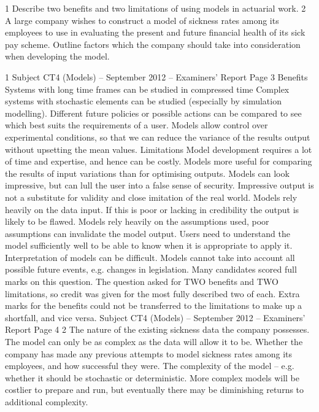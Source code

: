 \documentclass[a4paper,12pt]{article}
\begin{document}
\begin{enumerate}
1 Describe two benefits and two limitations of using models in actuarial work. 
2 A large company wishes to construct a model of sickness rates among its employees to use in evaluating the present and future financial health of its sick pay scheme.
Outline factors which the company should take into consideration when developing the model. 

1
Subject CT4 (Models) – September 2012 – Examiners’ Report
Page 3
Benefits
Systems with long time frames can be studied in compressed time
Complex systems with stochastic elements can be studied (especially by simulation
modelling).
Different future policies or possible actions can be compared to see which best suits the
requirements of a user.
Models allow control over experimental conditions, so that we can reduce the variance of the results output without upsetting the mean values.
Limitations
Model development requires a lot of time and expertise, and hence can be costly.
Models more useful for comparing the results of input variations than for optimising outputs.
Models can look impressive, but can lull the user into a false sense of security. Impressive output is not a substitute for validity and close imitation of the real world.
Models rely heavily on the data input. If this is poor or lacking in credibility the output is likely to be flawed.
Models rely heavily on the assumptions used, poor assumptions can invalidate the model
output.
Users need to understand the model sufficiently well to be able to know when it is
appropriate to apply it.
Interpretation of models can be difficult.
Models cannot take into account all possible future events, e.g. changes in legislation.
Many candidates scored full marks on this question. The question asked for TWO benefits
and TWO limitations, so credit was given for the most fully described two of each. Extra marks for the benefits could not be transferred to the limitations to make up a shortfall, and
vice versa.
Subject CT4 (Models) – September 2012 – Examiners’ Report
Page 4
2
The nature of the existing sickness data the company possesses. The model can only be as
complex as the data will allow it to be.
Whether the company has made any previous attempts to model sickness rates among its employees, and how successful they were.
The complexity of the model – e.g. whether it should be stochastic or deterministic. More
complex models will be costlier to prepare and run, but eventually there may be diminishing
returns to additional complexity.

\end{enumerate}
\end{document}
